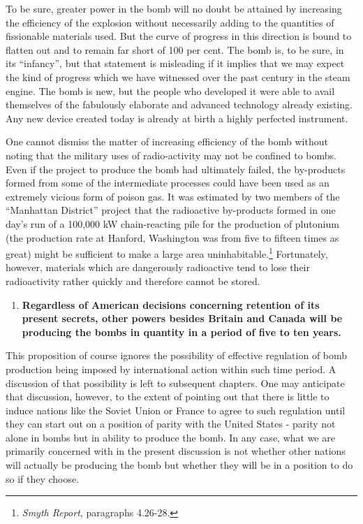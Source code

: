 To be sure, greater power in the bomb will no doubt be attained by increasing the efficiency of the explosion without necessarily adding to the quantities of fissionable materials used. But the curve of progress in this direction is bound to flatten out and to remain far short of 100 per cent. The bomb is, to be sure, in its ``infancy'', but that statement is misleading if it implies that we may expect the kind of progress which we have witnessed over the past century in the steam engine. The bomb is new, but the people who developed it were able to avail themselves of the fabulously elaborate and advanced technology already existing. Any new device created today is already at birth a highly perfected instrument.

One cannot dismiss the matter of increasing efficiency of the bomb without noting that the military uses of radio-activity may not be confined to bombs. Even if the project to produce the bomb had ultimately failed, the by-products formed from some of the intermediate processes could have been used as an extremely vicious form of poison gas. It was estimated by two members of the ``Manhattan District'' project that the radioactive by-products formed in one day's run of a 100,000 kW chain-reacting pile for the production of plutonium (the production rate at Hanford, Washington was from five to fifteen times as great) might be sufficient to make a large area uninhabitable.\footnote{\emph{Smyth Report}, paragraphs 4.26-28.} Fortunately, however, materials which are dangerously radioactive tend to lose their radioactivity rather quickly and therefore cannot be stored.

\begin{enumerate}[resume*]

\item \textbf{Regardless of American decisions concerning retention of its present secrets, other powers besides Britain and Canada will be producing the bombs in quantity in a period of five to ten years.}

\end{enumerate}

This proposition of course ignores the possibility of effective regulation of bomb production being imposed by international action within such time period. A discussion of that possibility is left to subsequent chapters. One may anticipate that discussion, however, to the extent of pointing out that there is little to induce nations like the Soviet Union or France to agree to such regulation until they can start out on a position of parity with the United States - parity not alone in bombs but in ability to produce the bomb. In any case, what we are primarily concerned with in the present discussion is not whether other nations will actually be producing the bomb but whether they will be in a position to do so if they choose.

